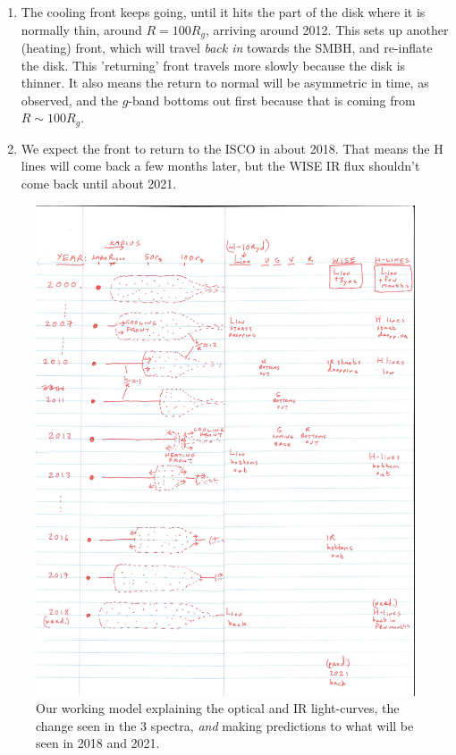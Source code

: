 \documentclass[11pt,a4paper]{article}
\begin{document}
\begin{enumerate}
\item The cooling front keeps going, until it hits the part of the
disk where it is normally thin, around $R=100 R_g$, arriving around
2012. This sets up another (heating) front, which will travel {\it
back in} towards the SMBH, and re-inflate the disk. This 'returning'
front travels more slowly because the disk is thinner. It also means
the return to normal will be asymmetric in time, as observed, and the
$g$-band bottoms out first because that is coming from
$R\sim100R_{g}$.

\item We expect the front to return to the ISCO in about 2018. That
means the H lines will come back a few months later, but the WISE IR
flux shouldn't come back until about 2021.

\end{enumerate}


\begin{figure}
  \centering
  \includegraphics[width=16.00cm, trim=0.0cm 0.0cm 0.0cm 0.0cm, clip] 
  {simple_model.pdf}
  \caption[]{
Our working model explaining the optical and IR light-curves, the
change seen in the 3 spectra, {\it and} making predictions to what
will be seen in 2018 and 2021.
}
  \label{fig:redink}
\end{figure}
\end{document}
